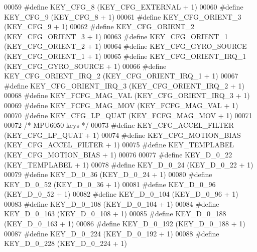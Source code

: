 \begin{DoxyCode}
00059 \textcolor{preprocessor}{#define KEY\_CFG\_8                   (KEY\_CFG\_EXTERNAL + 1)}
00060 \textcolor{preprocessor}{#define KEY\_CFG\_9                   (KEY\_CFG\_8 + 1)}
00061 \textcolor{preprocessor}{#define KEY\_CFG\_ORIENT\_3            (KEY\_CFG\_9 + 1)}
00062 \textcolor{preprocessor}{#define KEY\_CFG\_ORIENT\_2            (KEY\_CFG\_ORIENT\_3 + 1)}
00063 \textcolor{preprocessor}{#define KEY\_CFG\_ORIENT\_1            (KEY\_CFG\_ORIENT\_2 + 1)}
00064 \textcolor{preprocessor}{#define KEY\_CFG\_GYRO\_SOURCE         (KEY\_CFG\_ORIENT\_1 + 1)}
00065 \textcolor{preprocessor}{#define KEY\_CFG\_ORIENT\_IRQ\_1        (KEY\_CFG\_GYRO\_SOURCE + 1)}
00066 \textcolor{preprocessor}{#define KEY\_CFG\_ORIENT\_IRQ\_2        (KEY\_CFG\_ORIENT\_IRQ\_1 + 1)}
00067 \textcolor{preprocessor}{#define KEY\_CFG\_ORIENT\_IRQ\_3        (KEY\_CFG\_ORIENT\_IRQ\_2 + 1)}
00068 \textcolor{preprocessor}{#define KEY\_FCFG\_MAG\_VAL            (KEY\_CFG\_ORIENT\_IRQ\_3 + 1)}
00069 \textcolor{preprocessor}{#define KEY\_FCFG\_MAG\_MOV            (KEY\_FCFG\_MAG\_VAL + 1)}
00070 \textcolor{preprocessor}{#define KEY\_CFG\_LP\_QUAT             (KEY\_FCFG\_MAG\_MOV + 1)}
00071 
00072 \textcolor{comment}{/* MPU6050 keys */}
00073 \textcolor{preprocessor}{#define KEY\_CFG\_ACCEL\_FILTER        (KEY\_CFG\_LP\_QUAT + 1)}
00074 \textcolor{preprocessor}{#define KEY\_CFG\_MOTION\_BIAS         (KEY\_CFG\_ACCEL\_FILTER + 1)}
00075 \textcolor{preprocessor}{#define KEY\_TEMPLABEL               (KEY\_CFG\_MOTION\_BIAS + 1)}
00076 
00077 \textcolor{preprocessor}{#define KEY\_D\_0\_22                  (KEY\_TEMPLABEL + 1)}
00078 \textcolor{preprocessor}{#define KEY\_D\_0\_24                  (KEY\_D\_0\_22 + 1)}
00079 \textcolor{preprocessor}{#define KEY\_D\_0\_36                  (KEY\_D\_0\_24 + 1)}
00080 \textcolor{preprocessor}{#define KEY\_D\_0\_52                  (KEY\_D\_0\_36 + 1)}
00081 \textcolor{preprocessor}{#define KEY\_D\_0\_96                  (KEY\_D\_0\_52 + 1)}
00082 \textcolor{preprocessor}{#define KEY\_D\_0\_104                 (KEY\_D\_0\_96 + 1)}
00083 \textcolor{preprocessor}{#define KEY\_D\_0\_108                 (KEY\_D\_0\_104 + 1)}
00084 \textcolor{preprocessor}{#define KEY\_D\_0\_163                 (KEY\_D\_0\_108 + 1)}
00085 \textcolor{preprocessor}{#define KEY\_D\_0\_188                 (KEY\_D\_0\_163 + 1)}
00086 \textcolor{preprocessor}{#define KEY\_D\_0\_192                 (KEY\_D\_0\_188 + 1)}
00087 \textcolor{preprocessor}{#define KEY\_D\_0\_224                 (KEY\_D\_0\_192 + 1)}
00088 \textcolor{preprocessor}{#define KEY\_D\_0\_228                 (KEY\_D\_0\_224 + 1)}

\end{DoxyCode}
